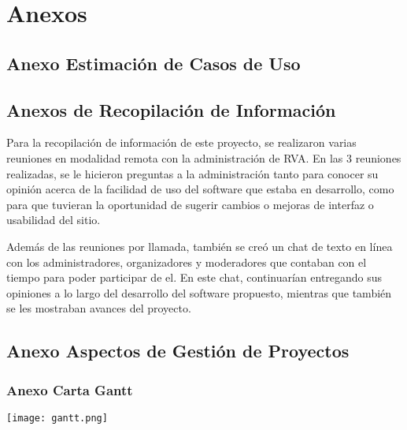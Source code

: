 \chapter{Anexos}

\section{Anexo Estimación de Casos de Uso}

\section{Anexos de Recopilación de Información}
Para la recopilación de información de este proyecto, se realizaron varias reuniones en modalidad remota con la administración de RVA. En las 3 reuniones realizadas, se le hicieron preguntas a la administración tanto para conocer su opinión acerca de la facilidad de uso del software que estaba en desarrollo, como para que tuvieran la oportunidad de sugerir cambios o mejoras de interfaz o usabilidad del sitio.

Además de las reuniones por llamada, también se creó un chat de texto en línea con los administradores, organizadores y moderadores que contaban con el tiempo para poder participar de el. En este chat, continuarían entregando sus opiniones a lo largo del desarrollo del software propuesto, mientras que también se les mostraban avances del proyecto.

\section{Anexo Aspectos de Gestión de Proyectos}

\subsection{Anexo Carta Gantt}

\texttt{[image: gantt.png]}

